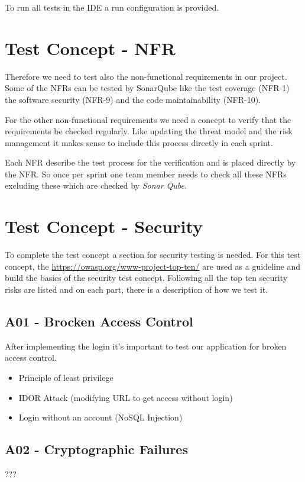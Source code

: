 To run all tests in the IDE a run configuration is provided.


\section{Test Concept - NFR}
Therefore we need to test also the non-functional requirements in our project. Some of the NFRs can be tested by SonarQube like the test coverage (NFR-1) the software security (NFR-9) and the code maintainability (NFR-10).

For the other non-functional requirements we need a concept to verify that the requirements be checked regularly. Like updating the threat model and the risk management it makes sense to include this process directly in each sprint.

Each NFR describe the test process for the verification and is placed directly by the NFR. So once per sprint one team member needs to check all these NFRs excluding these which are checked by \textit{Sonar Qube}.

\section{Test Concept - Security}
To complete the test concept a section for security testing is needed. For this test concept, the \href{OWASP Top Ten}{https://owasp.org/www-project-top-ten/} are used as a guideline and build the basics of the security test concept.
Following all the top ten security risks are listed and on each part, there is a description of how we test it.

\subsection{A01 - Brocken Access Control}
After implementing the login it's important to test our application for broken access control.

\begin{itemize}
  \item Principle of least privilege
  \item IDOR Attack (modifying URL to get access without login)
  \item Login without an account (NoSQL Injection)
\end{itemize}

\subsection{A02 - Cryptographic Failures}
???

